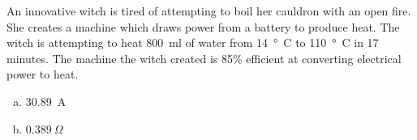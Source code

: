 \question An innovative witch is tired of attempting to boil her cauldron with an open fire. She creates a machine which draws power from a battery to produce heat. The witch is attempting to heat \SI{800}{ml} of water from \SI{14}{\degree C} to \SI{110}{\degree C} in 17 minutes. The machine the witch created is 85\% efficient at converting electrical power to heat. 
\begin{finalanswer}
\begin{enumerate}[(a)]
\item \SI{30.89}{A}
\item $\SI{0.389}{\Omega}$
\end{enumerate}
\end{finalanswer}

